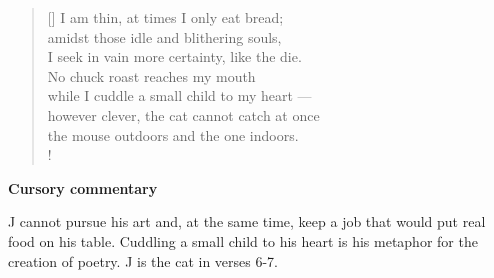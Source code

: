 \documentclass[a4paper,12pt,twoside,final]{book}
\begin{document}
\newpage


\settowidth{\versewidth}{however clever, the cat cannot catch at once}

\begin{verse}[\versewidth]
  I am thin, at times I only eat bread; \\
  amidst those idle and blithering souls, \\
  I seek in vain more certainty, like the die. \\
  No chuck roast reaches my mouth \\
  while I cuddle a small child to my heart --- \\
  however clever, the cat cannot catch at once \\
  the mouse outdoors and the one indoors. \\!
\end{verse}


\bigskip

\noindent \textbf{Cursory commentary}

\medskip

J cannot pursue his art and, at the same time, keep a job that would
put real food on his table. Cuddling a small child to his heart is his
metaphor for the creation of poetry. J is the cat in verses 6-7.

\newpage

\settowidth{\versewidth}{számhoz s szivemhez kisgyerek ---}
\end{document}
